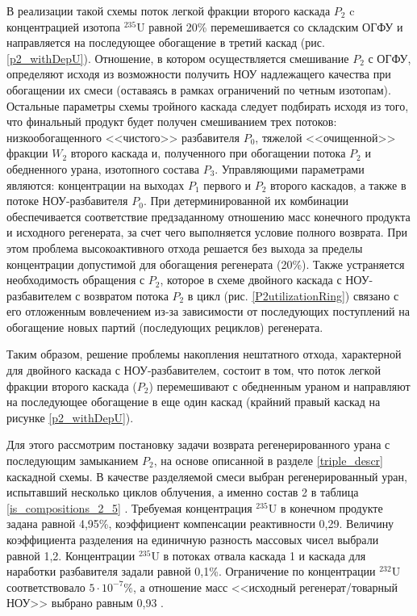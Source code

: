 В реализации такой схемы поток легкой фракции второго каскада $P_2$ c концентрацией изотопа $^{235}$U равной 20\% перемешивается со складским ОГФУ и направляется на последующее обогащение в третий каскад (рис. \ref{p2_withDepU}). Отношение, в котором осуществляется смешивание $P_2$ с ОГФУ, определяют исходя из возможности получить НОУ надлежащего качества при обогащении их смеси (оставаясь в рамках ограничений по четным изотопам). Остальные параметры схемы тройного каскада следует подбирать исходя из того, что финальный продукт будет получен смешиванием трех потоков: низкообогащенного <<чистого>> разбавителя $P_0$, тяжелой <<очищенной>> фракции $W_2$ второго каскада и, полученного при обогащении потока $P_2$ и обедненного урана, изотопного состава $P_3$. Управляющими параметрами являются: концентрации на выходах $P_1$ первого и $P_2$ второго каскадов, а также в потоке НОУ-разбавителя $P_0$. При детерминированной их комбинации обеспечивается соответствие предзаданному отношению масс конечного продукта и исходного регенерата, за счет чего выполняется условие полного возврата. При этом проблема высокоактивного отхода решается без выхода за пределы концентрации допустимой для обогащения регенерата (20\%). Также устраняется необходимость обращения с $P_2$, которое в схеме двойного каскада с НОУ-разбавителем с возвратом потока $P_2$ в цикл (рис. \ref{P2utilizationRing}) связано с его отложенным вовлечением из-за зависимости от последующих поступлений на обогащение новых партий (последующих рециклов) регенерата.

Таким образом, решение проблемы накопления нештатного отхода, характерной для двойного каскада с НОУ-разбавителем, состоит в том, что поток легкой фракции второго каскада ($P_2$) перемешивают с обедненным ураном и направляют на последующее обогащение в еще один каскад (крайний правый каскад на рисунке \ref{p2_withDepU}).


Для этого рассмотрим постановку задачи возврата регенерированного урана с последующим замыканием $P_2$, на основе описанной в разделе \ref{triple_descr} каскадной схемы. В качестве разделяемой смеси выбран регенерированный уран, испытавший несколько циклов облучения, а именно состав 2 в таблица \ref{is_compositions_2_5} \cite{smirnovObogashchenieRegenerirovannogoUrana2018}. Требуемая концентрация $^{235}$U в конечном продукте задана равной 4,95\%, коэффициент компенсации реактивности 0,29. Величину коэффициента разделения на единичную разность массовых чисел выбрали равной 1,2. Концентрации $^{235}$U в потоках отвала каскада 1 и каскада для наработки разбавителя задали равной 0,1\%. Ограничение по концентрации $^{232}$U соответствовало $5\cdot10^{-7} \%$, а отношение масс <<исходный регенерат/товарный НОУ>> выбрано равным 0,93 \cite{smirnovObogashchenieRegenerirovannogoUrana2018}.


